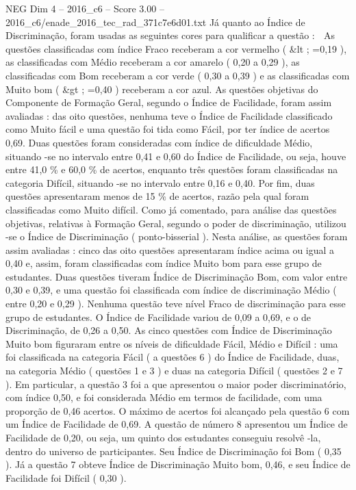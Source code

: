 \begin{textsample}{NEG Dim 4 – 2016\_c6 – Score 3.00 – 2016\_c6/enade\_2016\_tec\_rad\_371c7e6d01.txt}
Já quanto ao Índice de Discriminação, foram usadas as seguintes cores para qualificar a questão :  As questões classificadas com índice Fraco receberam a cor vermelho ( \&lt ; =0,19 ), as classificadas com Médio receberam a cor amarelo ( 0,20 a 0,29 ), as classificadas com Bom receberam a cor verde ( 0,30 a 0,39 ) e as classificadas com Muito bom ( \&gt ; =0,40 ) receberam a cor azul.
As questões objetivas do Componente de Formação Geral, segundo o Índice de Facilidade, foram assim avaliadas : das oito questões, nenhuma teve o Índice de Facilidade classificado como Muito fácil e uma questão foi tida como Fácil, por ter índice de acertos 0,69.
Duas questões foram consideradas com índice de dificuldade Médio, situando -se no intervalo entre 0,41 e 0,60 do Índice de Facilidade, ou seja, houve entre 41,0 \% e 60,0 \% de acertos, enquanto três questões foram classificadas na categoria Difícil, situando -se no intervalo entre 0,16 e 0,40.
Por fim, duas questões apresentaram menos de 15 \% de acertos, razão pela qual foram classificadas como Muito difícil.
Como já comentado, para análise das questões objetivas, relativas à Formação Geral, segundo o poder de discriminação, utilizou -se o Índice de Discriminação ( ponto-bisserial ).
Nesta análise, as questões foram assim avaliadas : cinco das oito questões apresentaram índice acima ou igual a 0,40 e, assim, foram classificadas com índice Muito bom para esse grupo de estudantes.
Duas questões tiveram Índice de Discriminação Bom, com valor entre 0,30 e 0,39, e uma questão foi classificada com índice de discriminação Médio ( entre 0,20 e 0,29 ).
Nenhuma questão teve nível Fraco de discriminação para esse grupo de estudantes.
O Índice de Facilidade variou de 0,09 a 0,69, e o de Discriminação, de 0,26 a 0,50.
As cinco questões com Índice de Discriminação Muito bom figuraram entre os níveis de dificuldade Fácil, Médio e Difícil : uma foi classificada na categoria Fácil ( a questões 6 ) do Índice de Facilidade, duas, na categoria Médio ( questões 1 e 3 ) e duas na categoria Difícil ( questões 2 e 7 ).
Em particular, a questão 3 foi a que apresentou o maior poder discriminatório, com índice 0,50, e foi considerada Médio em termos de facilidade, com uma proporção de 0,46 acertos.
O máximo de acertos foi alcançado pela questão 6 com um Índice de Facilidade de 0,69.
A questão de número 8 apresentou um Índice de Facilidade de 0,20, ou seja, um quinto dos estudantes conseguiu resolvê -la, dentro do universo de participantes.
Seu Índice de Discriminação foi Bom ( 0,35 ).
Já a questão 7 obteve Índice de Discriminação Muito bom, 0,46, e seu Índice de Facilidade foi Difícil ( 0,30 ).

\end{textsample}
